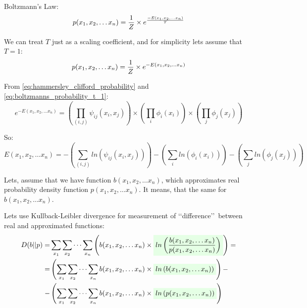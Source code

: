 \documentclass[fleqn,leqno]{article}
\newcommand{\highlight}[1]{\colorbox{green!10}{$\displaystyle#1$}}
\begin{document}
Boltzmann's Law:
\begin{equation*}
p(x_1, x_2, \dots x_n) = {1 \over Z} \times e^{{-E(x_1, x_2, \dots x_n) \over T}}
\end{equation*}

We can treat $T$ just as a scaling coefficient, and for simplicity lets assume that $T = 1$:
\begin{equation} \label{eq:boltzmanns_probability_t_1}
p(x_1, x_2, \dots x_n) = {1 \over Z} \times e^{-E(x_1, x_2, \dots x_n)}
\end{equation}

From \eqref{eq:hammersley_clifford_probability} and \eqref{eq:boltzmanns_probability_t_1}:
\begin{equation*}
e^{-E(x_1, x_2, \dots x_n)} = \left( \prod_{(i, j)} \psi_{ij}(x_i, x_j) \right) \times \left( \prod_{i} \phi_i(x_i) \right) \times \left( \prod_{j} \phi_j(x_j) \right)
\end{equation*}

So:
\begin{equation} \label{eq:energy_expression}
E(x_1, x_2, \dots x_n) = - \left( \sum_{(i, j)} ln(\psi_{ij}(x_i, x_j)) \right) - \left( \sum_{i} ln(\phi_i(x_i)) \right) - \left( \sum_{j} ln(\phi_j(x_j)) \right)
\end{equation}

Lets, assume that we have function $b(x_1, x_2, \dots x_n)$, which approximates real probability density function $p(x_1, x_2, \dots x_n)$.
It means, that  the same for $b(x_1, x_2, \dots x_n)$.

Lets use Kullback-Leibler divergence for measurement of \lq \lq difference\rq \rq\ between real and approximated functions:
\begin{equation}
\begin{split}
D(b||p) = & \sum_{x_1} \sum_{x_2} \cdots \sum_{x_n} \left( b(x_1, x_2, \dots x_n) \times \highlight{ ln \left( {b(x_1, x_2, \dots x_n) \over p(x_1, x_2, \dots x_n)} \right) } \right) = \\
            = & \left( \sum_{x_1} \sum_{x_2} \cdots \sum_{x_n} b(x_1, x_2, \dots x_n) \times \highlight{ ln \left( b(x_1, x_2, \dots x_n) \right) } \right) - \\
             - & \left( \sum_{x_1} \sum_{x_2} \cdots \sum_{x_n} b(x_1, x_2, \dots x_n) \times \highlight{ ln \left( p(x_1, x_2, \dots x_n) \right) } \right)
\end{split}
\end{equation}
\end{document}
